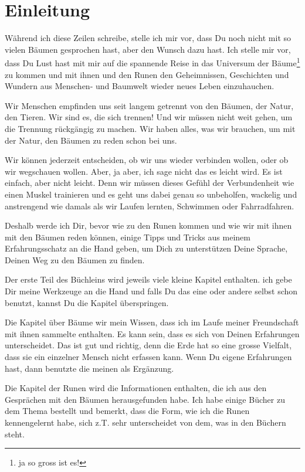 \documentclass[11pt,titlepage,a5paper]{book}
\begin{document}
\chapter{Einleitung}

Während ich diese Zeilen schreibe, stelle ich mir vor, dass Du noch nicht mit so vielen Bäumen gesprochen hast, aber den Wunsch dazu hast. Ich stelle mir vor, dass Du Lust hast mit mir auf die spannende Reise in das Universum der Bäume\footnote{ja so gross ist es!} zu kommen und mit ihnen und den Runen den Geheimnissen, Geschichten und Wundern aus Menschen- und Baumwelt wieder neues Leben einzuhauchen.

Wir Menschen empfinden uns seit langem getrennt von den Bäumen, der Natur, den Tieren. Wir sind es, die sich trennen! Und wir müssen nicht weit gehen, um die Trennung rückgängig zu machen. Wir haben alles, was wir brauchen, um mit der Natur, den Bäumen zu reden schon bei uns. 

Wir können jederzeit entscheiden, ob wir uns wieder verbinden wollen, oder ob wir wegschauen wollen. Aber, ja aber, ich sage nicht das es leicht wird. Es ist einfach, aber nicht leicht. Denn wir müssen dieses Gefühl der Verbundenheit wie einen Muskel trainieren und es geht uns dabei genau so unbeholfen, wackelig und anstrengend wie damals als wir Laufen lernten, Schwimmen oder Fahrradfahren.

Deshalb werde ich Dir, bevor wie zu den Runen kommen und wie wir mit ihnen mit den Bäumen reden können, einige Tipps und Tricks aus meinem Erfahrungsschatz an die Hand geben, um Dich zu unterstützen Deine Sprache, Deinen Weg zu den Bäumen zu finden.

Der erste Teil des Büchleins wird jeweils viele kleine Kapitel enthalten. ich gebe Dir meine Werkzeuge an die Hand und falls Du das eine oder andere selbst schon benutzt, kannst Du die Kapitel überspringen.

Die Kapitel über Bäume wir mein Wissen, dass ich im Laufe meiner Freundschaft mit ihnen sammelte enthalten. Es kann sein, dass es sich von Deinen Erfahrungen unterscheidet. Das ist gut und richtig, denn die Erde hat so eine grosse Vielfalt, dass sie ein einzelner Mensch nicht erfassen kann. Wenn Du eigene Erfahrungen hast, dann benutzte die meinen als Ergänzung.

Die Kapitel der Runen wird die Informationen enthalten, die ich aus den Gesprächen mit den Bäumen herausgefunden habe. Ich habe einige Bücher zu dem Thema bestellt und bemerkt, dass die Form, wie ich die Runen kennengelernt habe, sich z.T. sehr unterscheidet von dem, was in den Büchern steht.
\end{document}
